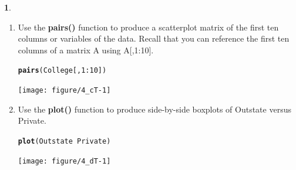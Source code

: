 \documentclass[12pt,fleqn]{article}\usepackage[]{graphicx}\usepackage[]{color}
\makeatletter
\newcommand{\hlnum}[1]{\textcolor[rgb]{0.686,0.059,0.569}{#1}}%
\newcommand{\hlopt}[1]{\textcolor[rgb]{0,0,0}{#1}}%
\newcommand{\hlstd}[1]{\textcolor[rgb]{0.345,0.345,0.345}{#1}}%
\newcommand{\hlkwd}[1]{\textcolor[rgb]{0.737,0.353,0.396}{\textbf{#1}}}%
\newenvironment{kframe}{%
 \def\at@end@of@kframe{}%
 \ifinner\ifhmode%
  \def\at@end@of@kframe{\end{minipage}}%
  \begin{minipage}{\columnwidth}%
 \fi\fi%
 \def\FrameCommand##1{\hskip\@totalleftmargin \hskip-\fboxsep
 \colorbox{shadecolor}{##1}\hskip-\fboxsep
     \hskip-\linewidth \hskip-\@totalleftmargin \hskip\columnwidth}%
 \MakeFramed {\advance\hsize-\width
   \@totalleftmargin\z@ \linewidth\hsize
   \@setminipage}}%
 {\par\unskip\endMakeFramed%
 \at@end@of@kframe}
\newenvironment{knitrout}{}{} %
\theoremstyle{definition}
\newtheorem{problem}{}
\makeatother
\begin{document}
\begin{problem}
\begin{enumerate}
	      \item Use the \textbf{pairs()} function to produce a scatterplot matrix of the first ten columns or variables of the data. Recall that you can reference the first ten columns of a matrix A using A[,1:10].
\begin{knitrout}
\color{fgcolor}\begin{kframe}
\begin{alltt}
\hlkwd{pairs}\hlstd{(College[,}\hlnum{1}\hlopt{:}\hlnum{10}\hlstd{])}
\end{alltt}
\end{kframe}
\end{knitrout}
\begin{knitrout}
\color{fgcolor}
\texttt{[image: figure/4\_cT-1]} 

\end{knitrout}

	      \item Use the \textbf{plot()} function to produce side-by-side boxplots of Outstate versus Private.
\begin{knitrout}
\color{fgcolor}\begin{kframe}
\begin{alltt}
\hlkwd{plot}\hlstd{(Outstate}\hlopt{~}\hlstd{Private)}
\end{alltt}
\end{kframe}
\end{knitrout}
\begin{knitrout}
\color{fgcolor}
\texttt{[image: figure/4\_dT-1]} 


\end{knitrout}
\end{enumerate}
\end{problem}
\end{document}
